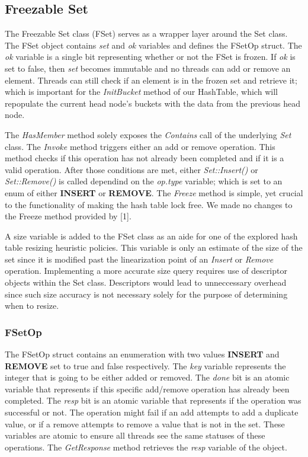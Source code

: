 \documentclass[11pt]{article} %
\begin{document}
\subsection{Freezable Set}

The Freezable Set class (FSet) serves as a wrapper layer around the Set class. The FSet object contains \textit{set} and \textit{ok} variables and defines the FSetOp struct. The \textit{ok} variable is a single bit representing whether or not the FSet is frozen. If \textit{ok} is set to false, then \textit{set} becomes immutable and no threads can add or remove an element. Threads can still check if an element is in the frozen set and retrieve it; which is important for the \textit{InitBucket} method of our HashTable, which will repopulate the current head node's buckets with the data from the previous head node.

The \textit{HasMember} method solely exposes the \textit{Contains} call of the underlying \textit{Set} class. The \textit{Invoke} method triggers either an add or remove operation. This method checks if this operation has not already been completed and if it is a valid operation. After those conditions are met, either \textit{Set::Insert()} or \textit{Set::Remove()} is called dependind on the \textit{op.type} variable; which is set to an enum of either \textbf{INSERT} or \textbf{REMOVE}. The \textit{Freeze} method is simple, yet crucial to the functionality of making the hash table lock free. We made no changes to the Freeze method provided by [1].

A size variable is added to the FSet class as an aide for one of the explored hash table resizing heuristic policies. This variable is only an estimate of the size of the set since it is modified past the linearization point of an \textit{Insert} or \textit{Remove} operation. Implementing a more accurate size query requires use of descriptor objects within the Set class. Descriptors would lead to unneccessary overhead since such size accuracy is not necessary solely for the purpose of determining when to resize.

\subsubsection{FSetOp}

The FSetOp struct contains an enumeration with two values \textbf{INSERT} and \textbf{REMOVE} set to true and false respectively. The \textit{key} variable represents the integer that is going to be either added or removed. The \textit{done} bit is an atomic variable that represents if this specific add/remove operation has already been completed. The \textit{resp} bit is an atomic variable that represents if the operation was successful or not. The operation might fail if an add attempts to add a duplicate value, or if a remove attempts to remove a value that is not in the set. These variables are atomic to ensure all threads see the same statuses of these operations. The \textit{GetResponse} method retrieves the \textit{resp} variable of the object.
\end{document}
